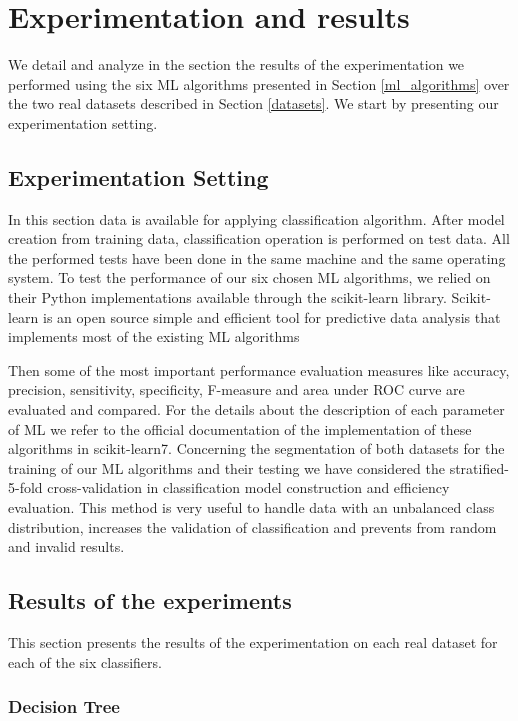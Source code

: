 \section{Experimentation and results}\label{experimentations}
We detail and analyze in the section the results of the experimentation we performed using the six ML algorithms presented in Section \ref{ml_algorithms} over the two real datasets described in Section \ref{datasets}. We start by presenting our experimentation setting.

\subsection{Experimentation Setting}
In this section data is available for applying classification algorithm. After model creation from training data, classification operation is performed on test data. 
All the performed tests have been done in the same machine and the same operating system. To test the performance of our six chosen ML algorithms, we relied on their Python implementations available through the scikit-learn library. Scikit-learn is an open source simple and efficient tool for predictive data analysis that implements most of the existing ML algorithms

Then some of the most important performance evaluation measures like accuracy, precision, sensitivity, specificity, F-measure and area under ROC curve are evaluated and compared. 
For the details about the description of each parameter of ML we refer to the official documentation of the implementation of these algorithms in scikit-learn7. Concerning the segmentation of both datasets for the training of our ML algorithms and their testing we have considered the stratified-5-fold cross-validation in classification model construction and efficiency evaluation. This method is very useful to handle data with an unbalanced class distribution, increases the validation of classification and prevents from random and invalid results.


\subsection{Results of the experiments}

This section presents the results of the experimentation on each real dataset for each of the six classifiers. 
\subsubsection{Decision Tree}

